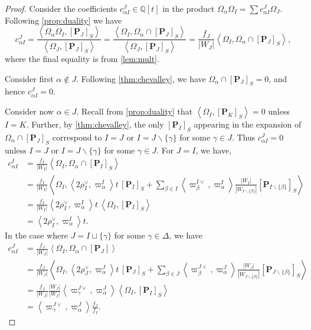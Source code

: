 \documentclass[10pt]{article}
\numberwithin{thm}{section}
\theoremstyle{definition}
\theoremstyle{remark}
\newcommand{\Pet}{\ensuremath{\mathbf{P}}}
\newcommand{\IQ}{\mathbb Q}
\begin{document}
\begin{proof}
Consider 
the coefficients $c_{\alpha I}^J\in\IQ[t]$ in the product  $\Omega_\alpha \Omega_I=\sum c_{\alpha I}^J \Omega_J$.
Following \cref{prop:duality} we have
\begin{equation*}
c_{\alpha I}^J=
\frac{\left\langle \Omega_\alpha \Omega_I,[\Pet_J]_S\right\rangle}
{\left\langle \Omega_J,[\Pet_J]_S\right\rangle}
=\frac{\left\langle \Omega_I,\Omega_\alpha\cap [\Pet_J]_S\right\rangle}
{\left\langle \Omega_J,[\Pet_J]_S\right\rangle}
=\frac{f_J}{|W_J|}\left\langle \Omega_I,\Omega_\alpha\cap [\Pet_J]_S\right\rangle,
\end{equation*}
where the final equality is from \cref{lem:mult}.

Consider first $\alpha\not\in J$.
Following \cref{thm:chevalley}, we have $\Omega_\alpha\cap[\Pet_J]_S=0$,
and hence $c_{\alpha I}^J=0$.

Consider now $\alpha\in J$.
Recall from \cref{prop:duality} that $\left\langle\Omega_I,[\Pet_K]_S\right\rangle=0$ unless $I=K$.
Further, by \cref{thm:chevalley}, the only $[\Pet_I]_S$ appearing in the expansion of $\Omega_\alpha\cap[\Pet_J]_S$
correspond to  $I=J$ or $I=J\backslash\{\gamma\}$ for some $\gamma\in J$.
Thus $c_{\alpha I}^J=0$ unless $I=J$ or $I=J\backslash\{\gamma\}$ for some $\gamma\in J$. 
For $J=I$, we have,
\begin{align*}
c_{\alpha I}^I
&=\frac{ f_I}{|W_I|}\left\langle\Omega_I, \Omega_\alpha\cap [\Pet_I]_S\right\rangle\\
&=\frac{f_I}{|W_I|}\left\langle \Omega_I, \left\langle2\rho_I^\vee,\varpi^I_\alpha\right\rangle t\,[\Pet_I]_S
+ \sum\limits_{\beta\in I} \left\langle\varpi^{I\vee}_\beta,\varpi^I_\alpha\right\rangle\frac{|W_I|}{|W_{I\backslash\{\beta\}}|}[\Pet_{I\backslash\{\beta\}}]_S \right\rangle\\
&=\frac{f_I}{|W_I|}\left\langle2\rho_I^\vee,\varpi^I_\alpha\right\rangle t\,\left\langle \Omega_I,[\Pet_I]_S\right\rangle\\
&= \left\langle2\rho_I^\vee,\varpi^I_\alpha\right\rangle t.
\end{align*}
In the case where $J=I\sqcup\{\gamma\}$ for some $\gamma\in\Delta$,
we have
\begin{align*}
c_{\alpha I}^J&=
\frac{ f_J}{|W_J|}\left\langle \Omega_I,\Omega_\alpha\cap [\Pet_J]\right\rangle\\
&=\frac{f_J}{|W_J|}\left\langle \Omega_I, \left\langle2\rho_J^\vee,\varpi^J_\alpha\right\rangle t\,[\Pet_J]_S
+ \sum\limits_{\beta\in J} \left\langle\varpi^{J\vee}_\beta,\varpi^J_\alpha\right\rangle\frac{|W_J|}{|W_{J\backslash\{\beta\}}|}[\Pet_{J\backslash\{\beta\}}]_S\right\rangle
\\
&=\frac{f_J}{|W_J|}\frac{|W_J|}{|W_I|}
\left\langle\varpi^{J\vee}_\gamma,\varpi^J_\alpha\right\rangle
\left\langle \Omega_I,
[\Pet_I]_S
\right\rangle \\
&= \left\langle\varpi^{J\vee}_\gamma,\varpi^J_\alpha\right\rangle
 \frac{f_J}{f_I}.
\end{align*}
\end{proof}
\end{document}
